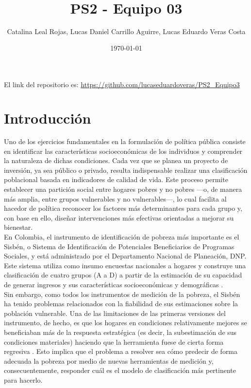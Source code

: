 \documentclass[12pt,a4paper,onecolumn]{article}
\title{PS2 - Equipo 03}
\author{Catalina Leal Rojas, Lucas Daniel Carrillo Aguirre, Lucas Eduardo Veras Costa}
\date{\today}
\begin{document}
\maketitle

\thispagestyle{empty} %

%

El link del repositorio es: \url{https://github.com/lucaseduardoveras/PS2_Equipo3}

\newpage         %
\setcounter{page}{1}



\section{Introducción} \label{sec:intro}

Uno de los ejercicios fundamentales en la formulación de política pública consiste en identificar las características socioeconómicas de los individuos y comprender la naturaleza de dichas condiciones. Cada vez que se planea un proyecto de inversión, ya sea público o privado, resulta indispensable realizar una clasificación poblacional basada en indicadores de calidad de vida. Este proceso permite establecer una partición social entre hogares pobres y no pobres —o, de manera más amplia, entre grupos vulnerables y no vulnerables—, lo cual facilita al hacedor de política reconocer los factores más determinantes para cada grupo y, con base en ello, diseñar intervenciones más efectivas orientadas a mejorar su bienestar.\\


En Colombia, el instrumento de identificación de pobreza más importante es el Sisbén, o Sistema de Identificación de Potenciales Beneficiarios de Programas Sociales, y está administrado por el Departamento Nacional de Planeación, DNP. Este sistema utiliza como insumo encuestas nacionales a hogares y construye una clasificación de cuatro grupos (A a D) a partir de la estimación de su capacidad de generar ingresos y sus características socioeconómicas y demográficas \citep{dnp2021sisben}.\\

Sin embargo, como todos los instrumentos de medición de la pobreza, el Sisbén ha tenido problemas relacionados con la fiabilidad de sus estimaciones sobre la población vulnerable.  Una de las limitaciones de las primeras versiones del instrumento, de hecho, es que los hogares en condiciones relativamente mejores se beneficiaban más de la respuesta estratégica (es decir, la subestimación de sus condiciones materiales) haciendo que la herramienta fuese de cierta forma regresiva \citep{bottia2008sisben}. Esto implica que el problema a resolver sea cómo predecir de forma adecuada la pobreza por medio de nuevas herramientas de medición y, consecuentemente, responder cuál es el modelo de clasificación más pertinente para hacerlo. \\
\end{document}
